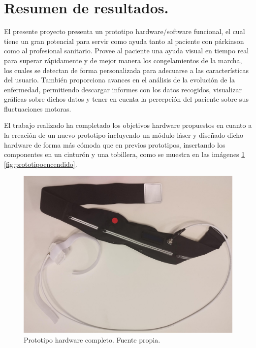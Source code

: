 


\section{Resumen de resultados.}
El presente proyecto presenta un prototipo hardware/software funcional, el cual tiene un gran potencial para servir como ayuda tanto al paciente con párkinson como al profesional sanitario. Provee al paciente una ayuda visual en tiempo real para superar rápidamente y de mejor manera los congelamientos de la marcha, los cuales se detectan de forma personalizada para adecuarse a las características del usuario. También proporciona avances en el análisis de la evolución de la enfermedad, permitiendo descargar informes con los datos recogidos, visualizar gráficas sobre dichos datos y tener en cuenta la percepción del paciente sobre sus fluctuaciones motoras.

El trabajo realizado ha completado los objetivos hardware propuestos en cuanto a la creación de un nuevo prototipo incluyendo un módulo láser y diseñado dicho hardware de forma más cómoda que en previos prototipos, insertando los componentes en un cinturón y una tobillera, como se muestra en las imágenes \ref{fig:prototipo} \ref{fig:prototipoencendido}.

\begin{figure}[h]
    \centering
    \includegraphics[width=1\textwidth]{img/prototipocompleto.jpg}
    \caption{Prototipo hardware completo. Fuente propia.}
    \label{fig:prototipo}
\end{figure}

